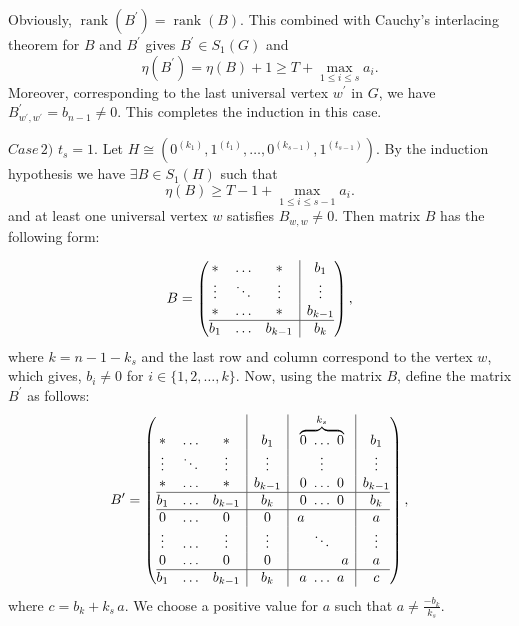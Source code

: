 \documentclass[3p,times,12pt]{article}
\DeclareMathOperator{\rank}{rank}
\begin{document}
Obviously, $\rank(B^{\prime})=\rank(B)$. This combined with Cauchy's interlacing theorem for $B$ and $B^{\prime}$ gives $B^{\prime}\in S_1(G)$ and
 \begin{equation}\nonumber
\eta(B^{\prime})=\eta(B)+1\ge T+\max_{1\le i \le s}a_i.
 \end{equation}
 Moreover, corresponding to the last universal vertex $w^{\prime}$ in $G$, we have $B^{\prime}_{w^{\prime}, w^{\prime}}=b_{n-1}\neq 0$. This completes the induction in this case. 

\vspace{3mm} 

$Case\, 2)$ $t_s=1$. Let $H\cong (0^{(k_1)}, 1^{(t_1)}, \ldots,0^{(k_{s-1})}, 1^{(t_{s-1})})$. By the induction hypothesis we have 
 $\exists B\in S_1(H)$ such that
 \begin{equation}\label{z_q1-2}
\eta(B)\ge T-1+\max_{1\le i \le s-1}a_i.
 \end{equation}
  and at least one universal vertex $w$ satisfies $B_{w,w}\neq 0$. Then matrix $B$ has the following form:
  
   $$B= \left(\begin{array}{@{}ccc|c@{}}
    * & \ldots & *& b_1  \\
    \vdots & \ddots & \vdots & \vdots  \\
    * & \ldots & * & b_{k-1}  \\\hline
    b_1 & \ldots & b_{k-1} & b_{k}  \\
  \end{array}\right),$$  where $k=n-1-k_s$ and the last row and column correspond to the vertex $w$, which gives,  $b_i\neq 0$ for $i\in \{1,2,\ldots, k\}$. Now, using the matrix $B$, define the matrix $B^{\prime}$ as follows: 
 $$B^{\prime}= \left(\begin{array}{@{}ccc|c|c|c@{}}
    * & \ldots & *& b_1 &\overbrace{0 ~\ldots ~ 0}^{k_s} & b_1 \\
    \vdots & \ddots & \vdots & \vdots &\vdots & \vdots \\
    * & \ldots & * & b_{k-1}  & 0~ \ldots ~ 0 &b_{k-1} \\\hline
    b_1 & \ldots & b_{k-1}  & b_k& 0 ~\ldots ~0 & b_k \\\hline
    0 & \ldots & 0  & 0& a ~~~~~~~~~ & a \\
    \vdots & \ldots & \vdots  & \vdots & \ddots & \vdots \\
   0 & \ldots & 0  & 0& ~~~~~~~~~~a & a \\\hline
    b_1 & \ldots & b_{k-1} & b_k & a~\ldots~a  & c
  \end{array}\right),$$ where $c=b_k+k_s\,a$. We choose a positive value for $a$ such that   $a\neq \frac{-b_k}{k_s}$. 
\end{document}
